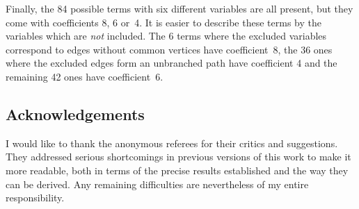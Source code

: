\documentclass[pdftex]{sigma}
\numberwithin{equation}{section}
\begin{document}
Finally, the 84 possible terms with six different variables are all present, but
they come with coefficients 8, 6 or~4. It is easier to describe these terms by the variables which are {\em not} included.
The 6 terms where the excluded variables correspond to edges without common vertices have coefficient~8, the 36 ones where
the excluded edges form an unbranched path have coefficient 4 and the remaining 42 ones have coefficient~6.


\subsection*{Acknowledgements}

I would like to thank the anonymous referees for their critics and suggestions. They addressed serious shortcomings
in previous versions of this work to make it more readable, both in terms of the precise results established and the
way they can be derived. Any remaining difficulties are nevertheless of my entire responsibility.
\end{document}
